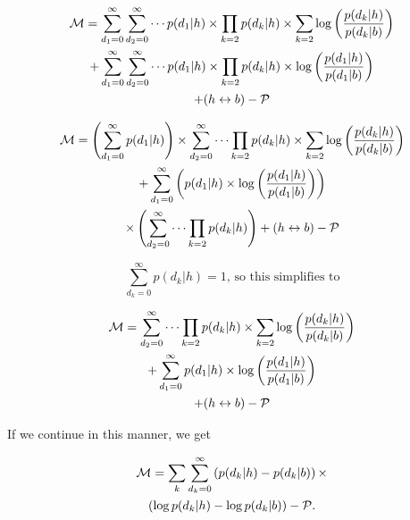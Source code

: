 \documentclass[twocolumn,twoside,prd]{revtex4} %
\begin{document}
\begin{multline}
\label{eqn:FigureOfMeritComplicated4}
{\cal M}  =  \sum_{d_1=0}^\infty \sum_{d_2=0}^\infty \cdots 
   {p(d_1|h)} \times \prod_{k=2}{ p(d_k|h)  }   \times \sum_{k=2} \log \left( \frac{p(d_k|h)}{p(d_k|b)} \right)\\
 + \sum_{d_1=0}^\infty \sum_{d_2=0}^\infty \cdots   {p(d_1|h)} \times \prod_{k=2}{ p(d_k|h)  }  \times  \log \left( \frac{p(d_1|h)}{p(d_1|b)} \right)  \\
 +  ( h \leftrightarrow b  ) - {\cal P}\\        
\end{multline}

\begin{multline}
\label{eqn:FigureOfMeritComplicated5}
{\cal M}  =  \left(\sum_{d_1=0}^\infty {p(d_1|h)} \right) \times \sum_{d_2=0}^\infty \cdots \prod_{k=2}{ p(d_k|h)  }   \times \sum_{k=2} \log \left( \frac{p(d_k|h)}{p(d_k|b)} \right)\\
 + \sum_{d_1=0}^\infty  \left( {p(d_1|h)} \times  \log \left( \frac{p(d_1|h)}{p(d_1|b)} \right)\right)  \\ 
\times \left(\sum_{d_2=0}^\infty \cdots \prod_{k=2}{ p(d_k|h)  }\right)  
 +  ( h \leftrightarrow b  ) - {\cal P}\\        
\end{multline}

\begin{equation}
\label{eqn:FigureOfMeritComplicated6}
\sum_{d_k=0}^\infty {p(d_k|h)} = 1 \mbox{, so this simplifies to}
\end{equation}

\begin{multline}
\label{eqn:FigureOfMeritComplicated7}
{\cal M}  =  \sum_{d_2=0}^\infty \cdots \prod_{k=2}{ p(d_k|h)  } \times \sum_{k=2} \log \left( \frac{p(d_k|h)}{p(d_k|b)} \right)\\
 + \sum_{d_1=0}^\infty   {p(d_1|h)} \times  \log \left( \frac{p(d_1|h)}{p(d_1|b)} \right) \\ 
 +  ( h \leftrightarrow b  ) - {\cal P}\\       
\end{multline}

If we continue in this manner, we get 

\begin{multline}
\label{eqn:FigureOfMerit}
{\cal M} = \sum_k \sum_{d_k=0}^\infty \left( p(d_k|h) - p(d_k|b) \right)\times \\\left( \log{ p(d_k|h) } - \log{ p(d_k|b) } \right) - {\cal P}.
\end{multline}
\end{document}
